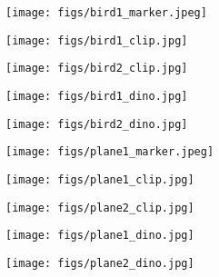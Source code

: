 \documentclass[10pt,twocolumn,letterpaper]{article}
\begin{document}
\begin{figure}[!t]
\centering
    \begin{subfigure}{0.18\linewidth}
        \centering
        \texttt{[image: figs/bird1\_marker.jpeg]}
\end{subfigure}
    \begin{subfigure}{0.18\linewidth}
        \centering
        \texttt{[image: figs/bird1\_clip.jpg]}
\end{subfigure}
    \begin{subfigure}{0.17\linewidth}
        \centering
        \texttt{[image: figs/bird2\_clip.jpg]}
\end{subfigure}
    \begin{subfigure}{0.18\linewidth}
        \centering
        \texttt{[image: figs/bird1\_dino.jpg]}
\end{subfigure}
    \begin{subfigure}{0.17\linewidth}
        \centering
        \texttt{[image: figs/bird2\_dino.jpg]}
\end{subfigure}

    \begin{subfigure}{0.18\linewidth}
        \centering
        \texttt{[image: figs/plane1\_marker.jpeg]}
\end{subfigure}
    \begin{subfigure}{0.18\linewidth}
        \centering
        \texttt{[image: figs/plane1\_clip.jpg]}
\end{subfigure}
    \begin{subfigure}{0.17\linewidth}
        \centering
        \texttt{[image: figs/plane2\_clip.jpg]}
\end{subfigure}
    \begin{subfigure}{0.18\linewidth}
        \centering
        \texttt{[image: figs/plane1\_dino.jpg]}
\end{subfigure}
    \begin{subfigure}{0.17\linewidth}
        \centering
        \texttt{[image: figs/plane2\_dino.jpg]}
\end{subfigure}


\end{figure}
\end{document}
